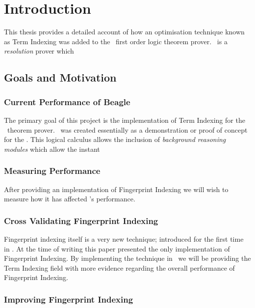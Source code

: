 
\chapter{Introduction}
\label{cha:intro}

This thesis provides a detailed account of how an optimisation technique known
as Term Indexing was added to the \beagle\ first order logic theorem prover. \Beagle\ 
is a \emph{resolution} prover which 

\section{Goals and Motivation}
\label{sec:mot}

\subsection{Current Performance of Beagle}

The primary goal of this project is the implementation of Term Indexing
for the \beagle\ theorem prover. 
\Beagle\ was created essentially as a demonstration or proof of concept for the \emph{\HSWAC} \cite{baum13}.
This logical calculus allows the inclusion of \emph{background reasoning modules}
which allow the instant 

\subsection{Measuring Performance}

After providing an implementation of Fingerprint Indexing we will wish to measure
how it has affected \beagle's performance.

\subsection{Cross Validating Fingerprint Indexing}

Fingerprint indexing itself is a very new technique; introduced for the first
time in \cite{shulz12}. At the time of writing this paper presented the only
implementation of Fingerprint Indexing. By implementing the technique in \beagle\ 
we will be providing the Term Indexing field with more evidence regarding the
overall performance of Fingerprint Indexing.

\subsection{Improving Fingerprint Indexing}

